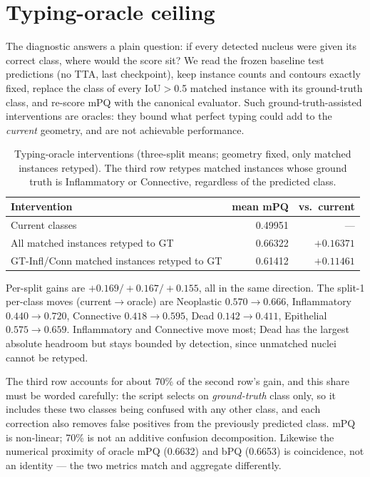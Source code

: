 \documentclass[11pt,a4paper]{article}
\begin{document}
\section{Typing-oracle ceiling}\label{sec:oracle}

The diagnostic answers a plain question: if every detected nucleus were given its correct class, where would the score sit? We read the frozen baseline test predictions (no TTA, last checkpoint), keep instance counts and contours exactly fixed, replace the class of every IoU$>$0.5 matched instance with its ground-truth class, and re-score mPQ with the canonical evaluator\cite{structure}. Such ground-truth-assisted interventions are oracles: they bound what perfect typing could add to the \emph{current} geometry, and are not achievable performance.

\begin{table}[H]
\centering\small
\caption{Typing-oracle interventions (three-split means; geometry fixed, only matched instances retyped). The third row retypes matched instances whose ground truth is Inflammatory or Connective, regardless of the predicted class.}
\label{tab:oracle}
\begin{tabular}{lrr}\toprule
Intervention & mean mPQ & vs.\ current\\\midrule
Current classes & 0.49951 & ---\\
All matched instances retyped to GT & 0.66322 & $+0.16371$\\
GT-Infl/Conn matched instances retyped to GT & 0.61412 & $+0.11461$\\
\bottomrule
\end{tabular}
\end{table}

Per-split gains are $+0.169/+0.167/+0.155$, all in the same direction. The split-1 per-class moves (current$\to$oracle) are Neoplastic $0.570\to0.666$, Inflammatory $0.440\to0.720$, Connective $0.418\to0.595$, Dead $0.142\to0.411$, Epithelial $0.575\to0.659$. Inflammatory and Connective move most; Dead has the largest absolute headroom but stays bounded by detection, since unmatched nuclei cannot be retyped.

The third row accounts for about 70\% of the second row's gain, and this share must be worded carefully: the script selects on \emph{ground-truth} class only, so it includes these two classes being confused with any other class, and each correction also removes false positives from the previously predicted class. mPQ is non-linear; 70\% is not an additive confusion decomposition\cite{structure}. Likewise the numerical proximity of oracle mPQ (0.6632) and bPQ (0.6653) is coincidence, not an identity --- the two metrics match and aggregate differently.
\end{document}
